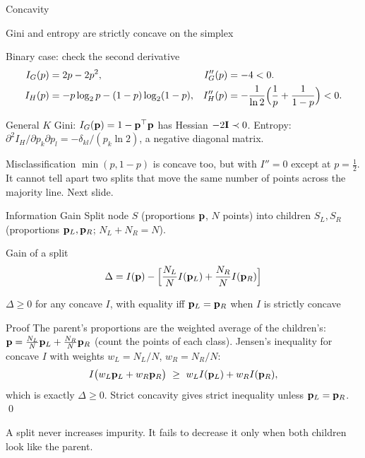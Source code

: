 \documentclass[11pt,aspectratio=169]{beamer}
\begin{document}
\begin{frame}{Concavity}\footnotesize
\begin{claim}{Gini and entropy are strictly concave on the simplex}
\end{claim}
\begin{derivation}{Binary case: check the second derivative}
\begin{align*}
I_G(p)&=2p-2p^2, & I_G''(p)&=-4<0 .\\
I_H(p)&=-p\log_2p-(1-p)\log_2(1-p), & I_H''(p)&=-\frac{1}{\ln2}\Bigl(\frac1p+\frac1{1-p}\Bigr)<0 .
\end{align*}
\end{derivation}
\begin{derivation}{General $K$}
Gini: $I_G(\mathbf{p})=1-\mathbf{p}^{\top}\mathbf{p}$ has Hessian $-2\mathbf{I}\prec0$. \quad
Entropy: $\partial^2I_H/\partial p_k\partial p_l=-\delta_{kl}/(p_k\ln2)$, a negative diagonal matrix.
\end{derivation}
\begin{keypoint}
Misclassification $\min(p,1-p)$ is concave too, but with $I''=0$ except at $p=\tfrac12$. It cannot tell
apart two splits that move the same number of points across the majority line. Next slide.
\end{keypoint}
\end{frame}

\begin{frame}{Information Gain}\small
Split node $S$ (proportions $\mathbf{p}$, $N$ points) into children $S_L,S_R$ (proportions $\mathbf{p}_L,\mathbf{p}_R$; $N_L+N_R=N$).
\begin{block}{Gain of a split}
\[
\Delta=I(\mathbf{p})-\Bigl[\frac{N_L}{N}I(\mathbf{p}_L)+\frac{N_R}{N}I(\mathbf{p}_R)\Bigr]
\]
\end{block}
\begin{claim}{$\Delta\ge0$ for any concave $I$, with equality iff $\mathbf{p}_L=\mathbf{p}_R$ when $I$ is strictly concave}
\end{claim}
\begin{derivation}{Proof}
The parent's proportions are the weighted average of the children's:
$\mathbf{p}=\frac{N_L}{N}\mathbf{p}_L+\frac{N_R}{N}\mathbf{p}_R$ (count the points of each class). Jensen's inequality for concave $I$
with weights $w_L=N_L/N$, $w_R=N_R/N$:
\[
I\bigl(w_L\vp_L+w_R\vp_R\bigr)\ \ge\ w_LI(\vp_L)+w_RI(\vp_R),
\]
which is exactly $\Delta\ge0$. Strict concavity gives strict inequality unless $\mathbf{p}_L=\mathbf{p}_R$. \qed
\end{derivation}
A split never increases impurity. It fails to decrease it only when both children look like the parent.
\end{frame}
\end{document}

